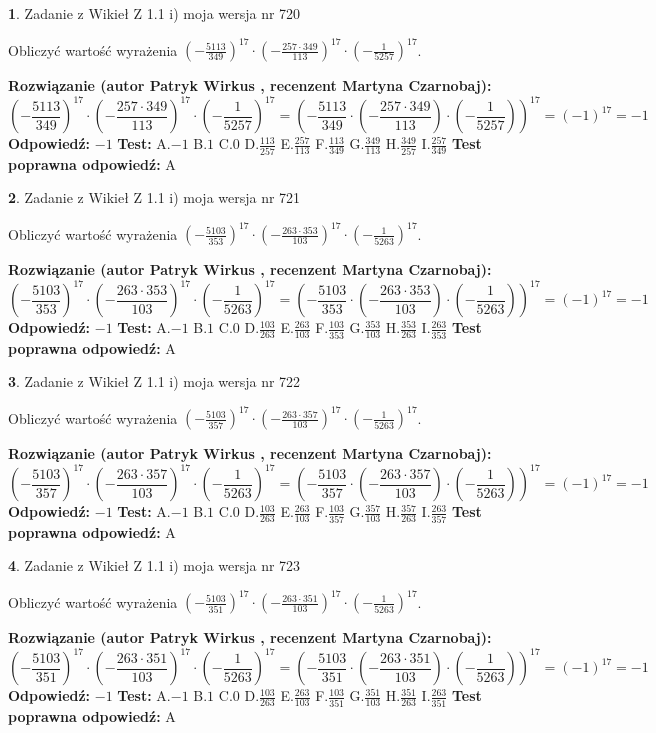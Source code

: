 \documentclass[12pt, a4paper]{article}
\theoremstyle{definition} %
\newtheorem{zad}{}
\newcommand{\zadStart}[1]{\begin{zad}#1\newline}
\newcommand{\zadStop}{\end{zad}}
\newcommand{\rozwStart}[2]{\noindent \textbf{Rozwiązanie (autor #1 , recenzent #2): }\newline}
\newcommand{\rozwStop}{\newline}
\newcommand{\odpStart}{\noindent \textbf{Odpowiedź:}\newline}
\newcommand{\odpStop}{\newline}
\newcommand{\testStart}{\noindent \textbf{Test:}\newline}
\newcommand{\testStop}{\newline}
\newcommand{\kluczStart}{\noindent \textbf{Test poprawna odpowiedź:}\newline}
\newcommand{\kluczStop}{\newline}
\begin{document}
\zadStart{Zadanie z Wikieł Z 1.1 i) moja wersja nr 720}

Obliczyć wartość wyrażenia $(-\frac{5113}{349})^{17} \cdot (-\frac{257 \cdot 349}{113})^{17} \cdot (-\frac{1}{5257})^{17}$.
\zadStop
\rozwStart{Patryk Wirkus}{Martyna Czarnobaj}
$$(-\frac{5113}{349})^{17} \cdot (-\frac{257 \cdot 349}{113})^{17} \cdot (-\frac{1}{5257})^{17} = (-\frac{5113}{349} \cdot (-\frac{257 \cdot 349}{113}) \cdot (-\frac{1}{5257}))^{17} = (-1)^{17} = -1$$
\rozwStop
\odpStart
$-1$
\odpStop
\testStart
A.$-1$ B.$1$ C.$0$ D.$\frac{113}{257}$ E.$\frac{257}{113}$
F.$\frac{113}{349}$ G.$\frac{349}{113}$
H.$\frac{349}{257}$
I.$\frac{257}{349}$
\testStop
\kluczStart
A
\kluczStop



\zadStart{Zadanie z Wikieł Z 1.1 i) moja wersja nr 721}

Obliczyć wartość wyrażenia $(-\frac{5103}{353})^{17} \cdot (-\frac{263 \cdot 353}{103})^{17} \cdot (-\frac{1}{5263})^{17}$.
\zadStop
\rozwStart{Patryk Wirkus}{Martyna Czarnobaj}
$$(-\frac{5103}{353})^{17} \cdot (-\frac{263 \cdot 353}{103})^{17} \cdot (-\frac{1}{5263})^{17} = (-\frac{5103}{353} \cdot (-\frac{263 \cdot 353}{103}) \cdot (-\frac{1}{5263}))^{17} = (-1)^{17} = -1$$
\rozwStop
\odpStart
$-1$
\odpStop
\testStart
A.$-1$ B.$1$ C.$0$ D.$\frac{103}{263}$ E.$\frac{263}{103}$
F.$\frac{103}{353}$ G.$\frac{353}{103}$
H.$\frac{353}{263}$
I.$\frac{263}{353}$
\testStop
\kluczStart
A
\kluczStop



\zadStart{Zadanie z Wikieł Z 1.1 i) moja wersja nr 722}

Obliczyć wartość wyrażenia $(-\frac{5103}{357})^{17} \cdot (-\frac{263 \cdot 357}{103})^{17} \cdot (-\frac{1}{5263})^{17}$.
\zadStop
\rozwStart{Patryk Wirkus}{Martyna Czarnobaj}
$$(-\frac{5103}{357})^{17} \cdot (-\frac{263 \cdot 357}{103})^{17} \cdot (-\frac{1}{5263})^{17} = (-\frac{5103}{357} \cdot (-\frac{263 \cdot 357}{103}) \cdot (-\frac{1}{5263}))^{17} = (-1)^{17} = -1$$
\rozwStop
\odpStart
$-1$
\odpStop
\testStart
A.$-1$ B.$1$ C.$0$ D.$\frac{103}{263}$ E.$\frac{263}{103}$
F.$\frac{103}{357}$ G.$\frac{357}{103}$
H.$\frac{357}{263}$
I.$\frac{263}{357}$
\testStop
\kluczStart
A
\kluczStop



\zadStart{Zadanie z Wikieł Z 1.1 i) moja wersja nr 723}

Obliczyć wartość wyrażenia $(-\frac{5103}{351})^{17} \cdot (-\frac{263 \cdot 351}{103})^{17} \cdot (-\frac{1}{5263})^{17}$.
\zadStop
\rozwStart{Patryk Wirkus}{Martyna Czarnobaj}
$$(-\frac{5103}{351})^{17} \cdot (-\frac{263 \cdot 351}{103})^{17} \cdot (-\frac{1}{5263})^{17} = (-\frac{5103}{351} \cdot (-\frac{263 \cdot 351}{103}) \cdot (-\frac{1}{5263}))^{17} = (-1)^{17} = -1$$
\rozwStop
\odpStart
$-1$
\odpStop
\testStart
A.$-1$ B.$1$ C.$0$ D.$\frac{103}{263}$ E.$\frac{263}{103}$
F.$\frac{103}{351}$ G.$\frac{351}{103}$
H.$\frac{351}{263}$
I.$\frac{263}{351}$
\testStop
\kluczStart
A
\kluczStop
\end{document}
